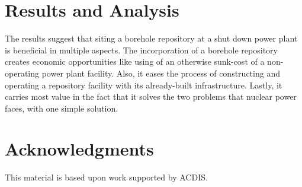 \documentclass{anstrans}
\begin{document}
\section{Results and Analysis}



The results suggest that siting a borehole repository at a shut down power plant is beneficial in multiple aspects. The incorporation of a borehole repository creates economic opportunities like using of an otherwise sunk-cost of a non-operating power 
plant facility. Also, it eases the process of constructing and operating a 
repository facility with its already-built infrastructure. Lastly, it carries most value in the fact that it solves the two problems that nuclear power faces, with one simple solution.

\section{Acknowledgments}

This material is based upon work supported by ACDIS.



\end{document}
